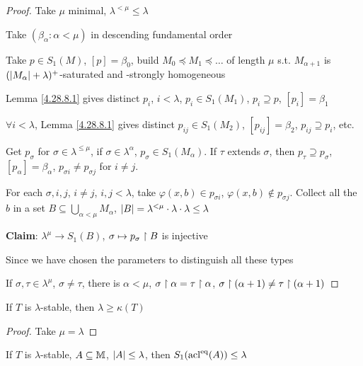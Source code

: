 \documentclass[11pt]{article}
\begin{document}
\begin{proof}
Take \(\mu\) minimal, \(\lambda^{<\mu}\le\lambda\)

Take \((\beta_\alpha:\alpha<\mu)\) in descending fundamental order

Take \(p\in S_1(M)\), \([p]=\beta_0\), build \(M_0\preceq M_1\preceq\dots\) of length \(\mu\) s.t. \(M_{\alpha+1}\)
is \((\abs{M_\alpha}+\lambda)^+\)-saturated and -strongly homogeneous

Lemma \ref{4.28.8.1} gives distinct \(p_i\), \(i<\lambda\), \(p_i\in S_1(M_1)\), \(p_i\supseteq p\), \([p_i]=\beta_1\)

\(\forall i<\lambda\), Lemma \ref{4.28.8.1} gives
distinct \(p_{ij}\in S_1(M_2)\), \([p_{ij}]=\beta_2\), \(p_{ij}\supseteq p_i\), etc.

Get \(p_\sigma\) for \(\sigma\in\lambda^{\le\mu}\), if \(\sigma\in\lambda^\alpha\), \(p_\sigma\in S_1(M_\alpha)\). If \(\tau\) extends \(\sigma\),
then \(p_\tau\supseteq p_\sigma\), \([p_\alpha]=\beta_\alpha\), \(p_{\sigma i}\neq p_{\sigma j}\) for \(i\neq j\).

For each \(\sigma,i,j\), \(i\neq j\), \(i,j<\lambda\), take \(\varphi(x,b)\in p_{\sigma i}\), \(\varphi(x,b)\notin p_{\sigma j}\). Collect
all the \(b\) in a set \(B\subseteq\bigcup_{\alpha<\mu}M_\alpha\), \(\abs{B}=\lambda^{<\mu}\cdot\lambda\cdot\lambda\le\lambda\)

\textbf{Claim}: \(\lambda^\mu\to S_1(B)\), \(\sigma\mapsto p_\sigma\upharpoonright B\) is injective

Since we have chosen the parameters to distinguish all these types

If \(\sigma,\tau\in \lambda^\mu\), \(\sigma\neq\tau\), there is \(\alpha<\mu\), \(\sigma\upharpoonright\alpha=\tau\upharpoonright\alpha\), \(\sigma\upharpoonright(\alpha+1)\neq\tau\upharpoonright(\alpha+1)\)
\end{proof}

\begin{corollary}[]
\label{4.28.8.3}
If \(T\) is \(\lambda\)-stable, then \(\lambda\ge\kappa(T)\)
\end{corollary}

\begin{proof}
Take \(\mu=\lambda\)
\end{proof}

\begin{lemma}[]
\label{4.28.8.4}
If \(T\) is \(\lambda\)-stable, \(A\subseteq\mathbb{M}\), \(\abs{A}\le\lambda\), then \(S_1(\operatorname{acl}^{\operatorname{eq}}(A))\le\lambda\)
\end{lemma}
\end{document}
